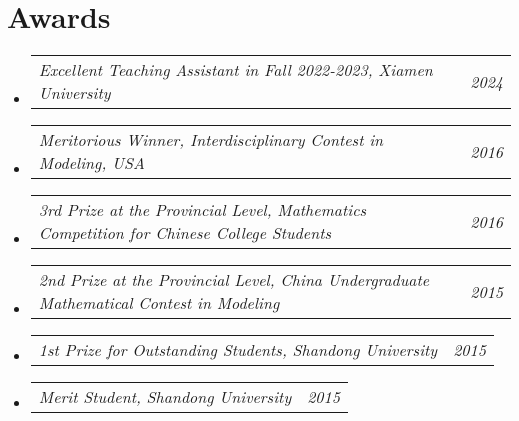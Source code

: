 \documentclass[letterpaper,10pt]{article}
\makeatletter
\newcommand{\resumeSubSubheading}[2]{
    \item
    \begin{tabular*}{0.97\textwidth}{l@{\extracolsep{\fill}}r}
      \textit{\small#1} & \textit{\small #2} \\
    \end{tabular*}\vspace{-7pt}
}
\newcommand{\resumeSubHeadingListStart}{\begin{itemize}[leftmargin=0.15in, label={}]}
\newcommand{\resumeSubHeadingListEnd}{\end{itemize}}
\makeatother
\begin{document}
  \section{Awards}
  \resumeSubHeadingListStart
    \resumeSubSubheading
      {Excellent Teaching Assistant in Fall 2022-2023, Xiamen University}{2024}
    \resumeSubSubheading
      {Meritorious Winner, Interdisciplinary Contest in Modeling, USA}{2016}
    \resumeSubSubheading
      {3rd Prize at the Provincial Level, Mathematics Competition for Chinese College Students}{2016}
    \resumeSubSubheading
      {2nd Prize at the Provincial Level, China Undergraduate Mathematical Contest in Modeling}{2015}
    \resumeSubSubheading
      {1st Prize for Outstanding Students, Shandong University}{2015}
    \resumeSubSubheading
      {Merit Student, Shandong University}{2015}
  \resumeSubHeadingListEnd
\end{document}
